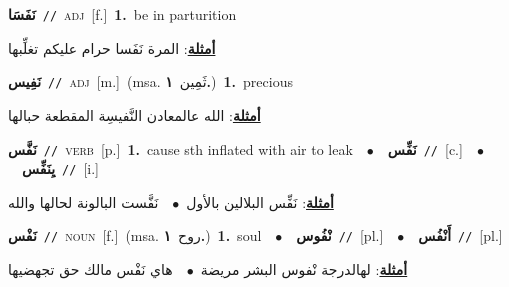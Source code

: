 \documentclass[10pt,a4paper,twoside]{article} %
\begin{document}
\begin{multicols}{2}
{\setlength\topsep{0pt}\textbf{\foreignlanguage{arabic}{نَفَسَا}}\ {\color{gray}\texttt{//}\color{black}}\ \textsc{adj}\ [f.]\ \textbf{1.}~be in parturition\  \begin{flushright}\color{gray}\foreignlanguage{arabic}{\textbf{\underline{\foreignlanguage{arabic}{أمثلة}}}: المرة نَفَسا حرام عليكم تغلِّبها}\end{flushright}\color{black}} \vspace{2mm}

{\setlength\topsep{0pt}\textbf{\foreignlanguage{arabic}{نَفِيس}}\ {\color{gray}\texttt{//}\color{black}}\ \textsc{adj}\ [m.]\ \color{gray}(msa. \foreignlanguage{arabic}{ثَمِين}~\foreignlanguage{arabic}{\textbf{١.}})\color{black}\ \textbf{1.}~precious\  \begin{flushright}\color{gray}\foreignlanguage{arabic}{\textbf{\underline{\foreignlanguage{arabic}{أمثلة}}}: الله عالمعادن النَّفيسِة المقطعة حبالها}\end{flushright}\color{black}} \vspace{2mm}

{\setlength\topsep{0pt}\textbf{\foreignlanguage{arabic}{نَفَّس}}\ {\color{gray}\texttt{//}\color{black}}\ \textsc{verb}\ [p.]\ \textbf{1.}~cause sth inflated with air to leak\ \ $\bullet$\ \ \setlength\topsep{0pt}\textbf{\foreignlanguage{arabic}{نَفِّس}}\ {\color{gray}\texttt{//}\color{black}}\ [c.]\ \ $\bullet$\ \ \setlength\topsep{0pt}\textbf{\foreignlanguage{arabic}{يِنَفِّس}}\ {\color{gray}\texttt{//}\color{black}}\ [i.]\  \begin{flushright}\color{gray}\foreignlanguage{arabic}{\textbf{\underline{\foreignlanguage{arabic}{أمثلة}}}: نَفِّس البلالين بالأول\ $\bullet$\ \  نَفَّست البالونة لحالها والله}\end{flushright}\color{black}} \vspace{2mm}

{\setlength\topsep{0pt}\textbf{\foreignlanguage{arabic}{نَفْس}}\ {\color{gray}\texttt{//}\color{black}}\ \textsc{noun}\ [f.]\ \color{gray}(msa. \foreignlanguage{arabic}{روح}~\foreignlanguage{arabic}{\textbf{١.}})\color{black}\ \textbf{1.}~soul\ \ $\bullet$\ \ \setlength\topsep{0pt}\textbf{\foreignlanguage{arabic}{نْفُوس}}\ {\color{gray}\texttt{//}\color{black}}\ [pl.]\ \ $\bullet$\ \ \setlength\topsep{0pt}\textbf{\foreignlanguage{arabic}{أَنْفُس}}\ {\color{gray}\texttt{//}\color{black}}\ [pl.]\  \begin{flushright}\color{gray}\foreignlanguage{arabic}{\textbf{\underline{\foreignlanguage{arabic}{أمثلة}}}: لهالدرجة نْفوس البشر مريضة\ $\bullet$\ \  هاي نَفْس مالك حق تجهضيها}\end{flushright}\color{black}} \vspace{2mm}


\end{multicols}
\end{document}
